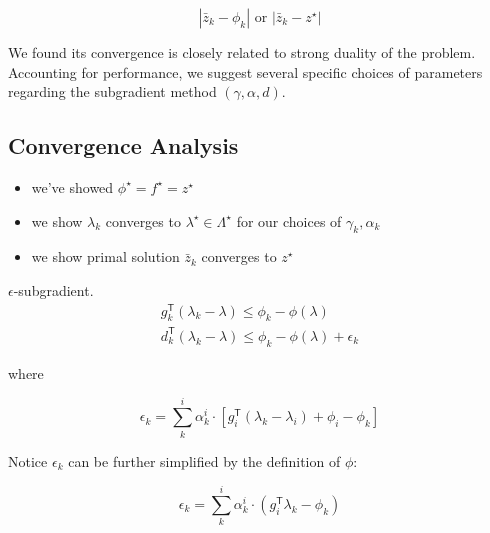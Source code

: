 \documentclass[../main]{subfiles}
\begin{document}
\[
  |\bar z_k - \phi_k| \textrm { or } |\bar z_k - z^\star|
\]

We found its convergence is closely related to strong duality of the problem. Accounting for performance,
we suggest several specific choices of parameters regarding the subgradient method \((\gamma, \alpha, d)\).


\subsection{Convergence Analysis}\label{dual.analysis}

\begin{itemize}

  \item
        we've showed \(\phi^\star = f^\star= z^\star\)
  \item
        we show \(\lambda_k\) converges to \(\lambda^\star \in \Lambda^\star\)
        for our choices of \(\gamma_k, \alpha_k\)
  \item
        we show primal solution \(\bar z_k\) converges to \(z^\star\)
\end{itemize}

\begin{lemma}\(\epsilon\)-subgradient.
  \begin{equation}\label{eq:subgrad}
    \begin{aligned}
      g_{k}^\mathsf{T}(\lambda_{k}  -\lambda) \le \phi_{k} - \phi(\lambda) \\
      d_{k}^\mathsf{T}(\lambda_{k}  -\lambda) \le \phi_{k} - \phi(\lambda) + \epsilon_k
    \end{aligned}
  \end{equation}
\end{lemma}

where

\begin{equation}\label{eq:def_eps}
  \epsilon_k = \sum^i_k \alpha^i_k \cdot \left [g_i^\mathsf{T}(\lambda_k - \lambda_i) + \phi_i - \phi_k \right ]
\end{equation}

Notice \(\epsilon_k\) can be further simplified by the definition of
\(\phi\):

\begin{equation}\label{eq:def_eps_simple}
  \epsilon_k = \sum^i_k \alpha^i_k \cdot \left ( g_i^\mathsf{T}\lambda_k  - \phi_k \right )
\end{equation}
\end{document}
